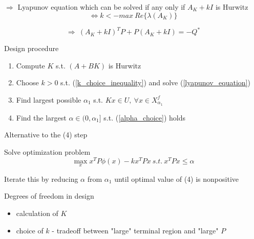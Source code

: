 $\Rightarrow$ Lyapunov equation which can be solved if any only if $A_K + kI$ is Hurwitz 
\begin{equation}\label{k_choice_inequality}
\Leftrightarrow k < - max\ Re \{ \lambda(A_K)\}
\end{equation}

\begin{equation}\label{lyapunov_equation}
\Rightarrow\ (A_K + kI)^TP + P(A_K + kI) = - Q^*
\end{equation}

Design procedure 
\begin{enumerate}
\item Compute $K$ s.t. $(A+BK)$ is Hurwitz 
\item Choose $k > 0$ s.t. (\ref{k_choice_inequality}) and solve (\ref{lyapunov_equation})
\item Find largest possible $\alpha_1$ s.t. $Kx \in U, \ \forall x \in X^f_{\alpha_1}$ 
\item Find the largest $\alpha \in (0,\alpha_1]$ s.t. (\ref{alpha_choice}) holds
\end{enumerate}

Alternative to the (4) step

Solve optimization problem 
\begin{equation}
\max_{x} x^TP\phi(x) - kx^TPx \ s.t. \ x^TPx \leq \alpha
\end{equation}

Iterate this by reducing $\alpha$ from $\alpha_1$ until optimal value of (4) is nonpositive

Degrees of freedom in design
\begin{itemize}
\item calculation of $K$
\item choice of $k$ - tradeoff between "large" terminal region and "large" $P$
\end{itemize}
